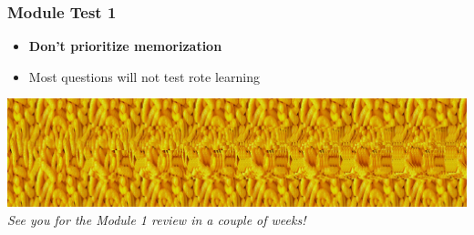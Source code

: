 \documentclass{beamer}
\begin{document}
\begin{frame}
\frametitle{Module Test 1}

\begin{itemize}
	\item \textbf{Don't prioritize memorization}
	\item Most questions will not test rote learning
\end{itemize}
\vspace{10pt}
				\includegraphics[keepaspectratio, width  = \textwidth]{img/magicEye}\\
\vspace{10pt}
\centering \textit{See you for the Module 1 review in a couple of weeks!}

\end{frame}
\end{document}
